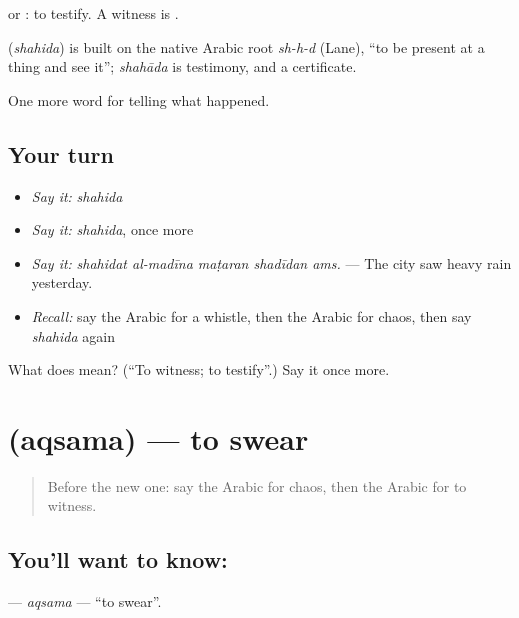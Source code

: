   or  : to testify. A witness is .

\begin{cousinweb}
\textbf{} (\emph{shahida}) is built on the native Arabic root \emph{sh-h-d} (Lane), \textquotedblleft{}to be present at a thing and see it\textquotedblright{}; \emph{shahāda} is testimony, and a certificate.
\end{cousinweb}

\begin{grammarlens}[title={What you've built}]
One more word for telling what happened.
\end{grammarlens}

\subsection*{Your turn}
\begin{itemize}
\raggedright
  \item \emph{Say it:} \emph{shahida}
  \item \emph{Say it:} \emph{shahida}, once more
  \item \emph{Say it:} \emph{shahidat al-madīna maṭaran shadīdan ams.} — The city saw heavy rain yesterday.
  \item \emph{Recall:} say the Arabic for a whistle, then the Arabic for chaos, then say \emph{shahida} again
\end{itemize}

\begin{tcolorbox}[breakable,colback=teal!4,colframe=teal!35!black,title={Before you move on}]
What does  mean? (\textquotedblleft{}To witness; to testify\textquotedblright{}.) Say it once more.
\end{tcolorbox}
\section[\texorpdfstring{\ar{أقسم} (aqsama)}{أقسم (aqsama)}]{ (aqsama) — to swear}

\label{lesson:AR-C325-aqsama}



\begin{quote}
Before the new one: say the Arabic for chaos, then the Arabic for to witness.
\end{quote}

\subsection*{You'll want to know: }
\textbf{} — \emph{aqsama} — \textquotedblleft{}to swear\textquotedblright{}.

